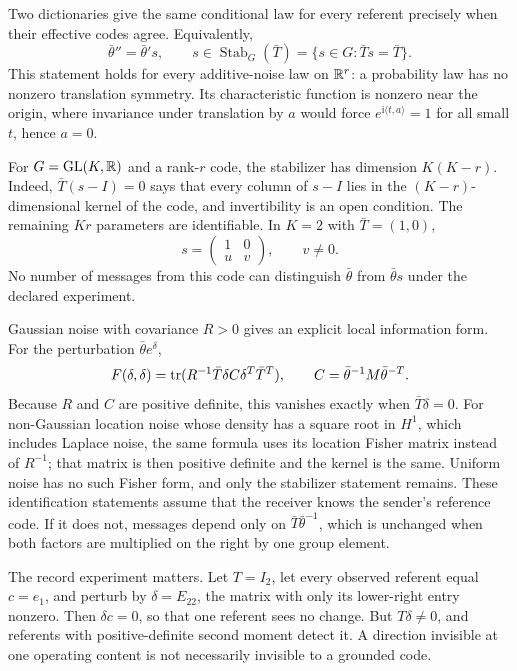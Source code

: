 Two dictionaries give the same conditional law for every referent precisely when their effective codes agree. Equivalently,
\begin{equation}
\bar\theta''=\bar\theta's,\qquad
s\in\operatorname{Stab}_G(\bar T)
=\{s\in G:\bar Ts=\bar T\}.
\label{c17:stabilizer}
\end{equation}
This statement holds for every additive-noise law on $\mathbb R^r$: a probability law has no nonzero translation symmetry. Its characteristic function is nonzero near the origin, where invariance under translation by $a$ would force $e^{\mathrm i\langle t,a\rangle}=1$ for all small $t$, hence $a=0$.

For $G=\mathrm{GL}(K,\mathbb R)$ and a rank-$r$ code, the stabilizer has dimension $K(K-r)$. Indeed, $\bar T(s-I)=0$ says that every column of $s-I$ lies in the $(K-r)$-dimensional kernel of the code, and invertibility is an open condition. The remaining $Kr$ parameters are identifiable. In $K=2$ with $\bar T=(1,0)$,
\begin{equation}
s=\begin{pmatrix}1&0\\u&v\end{pmatrix},\qquad v\neq0.
\end{equation}
No number of messages from this code can distinguish $\bar\theta$ from $\bar\theta s$ under the declared experiment.

Gaussian noise with covariance $R>0$ gives an explicit local information form. For the perturbation $\bar\theta e^\delta$,
\begin{equation}
F(\delta,\delta)
=\operatorname{tr}(R^{-1}\bar T\delta C\delta^T\bar T^T),\qquad
C=\bar\theta^{-1}M\bar\theta^{-T}.
\label{c17:information}
\end{equation}
Because $R$ and $C$ are positive definite, this vanishes exactly when $\bar T\delta=0$. For non-Gaussian location noise whose density has a square root in $H^1$, which includes Laplace noise, the same formula uses its location Fisher matrix instead of $R^{-1}$; that matrix is then positive definite and the kernel is the same. Uniform noise has no such Fisher form, and only the stabilizer statement remains. These identification statements assume that the receiver knows the sender's reference code. If it does not, messages depend only on $\bar T\bar\theta^{-1}$, which is unchanged when both factors are multiplied on the right by one group element.

The record experiment matters. Let $T=I_2$, let every observed referent equal $c=e_1$, and perturb by $\delta=E_{22}$, the matrix with only its lower-right entry nonzero. Then $\delta c=0$, so that one referent sees no change. But $T\delta\neq0$, and referents with positive-definite second moment detect it. A direction invisible at one operating content is not necessarily invisible to a grounded code.

